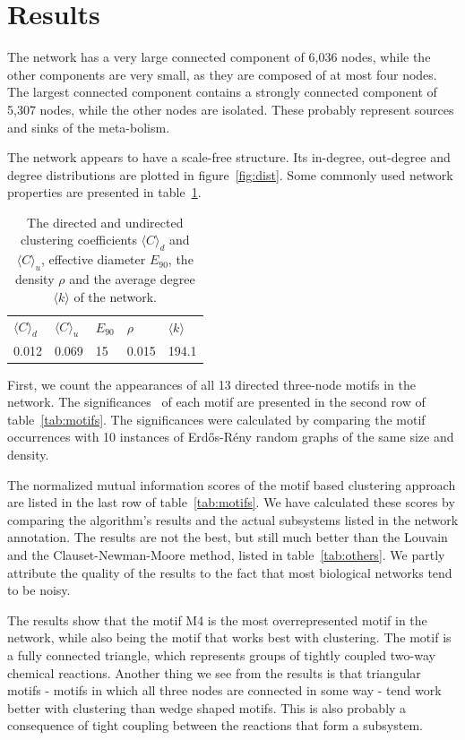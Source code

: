 \section{Results}
\label{sec:results}

The network has a very large connected component of 6,036 nodes, while the other
components are very small, as they are composed of at most four nodes. The
largest connected component contains a strongly connected component of 5,307
nodes, while the other nodes are isolated. These probably represent sources and
sinks of the meta-bolism.

The network appears to have a scale-free structure. Its in-degree, out-degree
and degree distributions are plotted in figure~\ref{fig:dist}. Some commonly
used network properties are presented in table~\ref{tab:metrics}.

\begin{table}
  \centering
  \begin{tabular}{l|l|l|l|l}
    $\langle C \rangle_d$ & $\langle C \rangle_u$ & $E_{90}$ & $\rho$ & $\langle
    k \rangle$ \\ 0.012 & 0.069 & 15 & 0.015 & 194.1
  \end{tabular}
  \caption{The directed and undirected clustering coefficients $\langle
    C\rangle_d$ and $\langle C\rangle_u$, effective diameter $E_{90}$, the
    density $\rho$ and the average degree $\langle k \rangle$ of the network.}
  \label{tab:metrics}
\end{table}

First, we count the appearances of all 13 directed three-node motifs in the
network. The significances~\cite{milo2002network} of each motif are presented in
the second row of table~\ref{tab:motifs}. The significances were calculated by
comparing the motif occurrences with 10 instances of Erdős-Rény random graphs of
the same size and density.

The normalized mutual information scores of the motif based clustering approach
are listed in the last row of table~\ref{tab:motifs}. We have calculated these
scores by comparing the algorithm's results and the actual subsystems listed in
the network annotation. The results are not the best, but still much better than
the Louvain and the Clauset-Newman-Moore method, listed in
table~\ref{tab:others}. We partly attribute the quality of the results to the
fact that most biological networks tend to be noisy.

The results show that the motif M4 is the most overrepresented motif in the
network, while also being the motif that works best with clustering. The motif
is a fully connected triangle, which represents groups of tightly coupled
two-way chemical reactions. Another thing we see from the results is that
triangular motifs - motifs in which all three nodes are connected in some way -
tend work better with clustering than wedge shaped motifs. This is also probably
a consequence of tight coupling between the reactions that form a subsystem.

